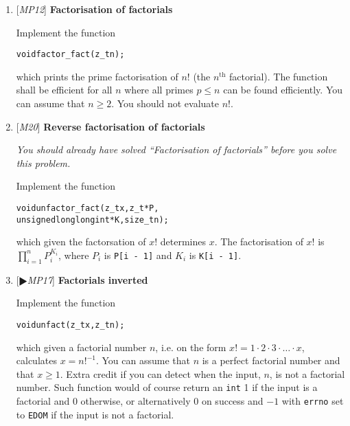 \begin{enumerate}[label=\textbf{\arabic*}.]
\item {[\textit{MP12}]} \textbf{Factorisation of factorials}

Implement the function

\vspace{-1em}
\begin{alltt}
   void factor_fact(z_t n);
\end{alltt}
\vspace{-1em}

\noindent
which prints the prime factorisation of $n!$
(the $n^{\text{th}}$ factorial). The function shall
be efficient for all $n$ where all primes $p \le n$
can be found efficiently. You can assume that
$n \ge 2$. You should not evaluate $n!$.



\item {[\textit{M20}]} \textbf{Reverse factorisation of factorials}

{\small\textit{You should already have solved
``Factorisation of factorials'' before you solve
this problem.}}

Implement the function

\vspace{-1em}
\begin{alltt}
   void unfactor_fact(z_t x, z_t *P,
        unsigned long long int *K, size_t n);
\end{alltt}
\vspace{-1em}

\noindent
which given the factorsation of $x!$ determines $x$.
The factorisation of $x!$ is
$\displaystyle{\prod_{i = 1}^{n} P_i^{K_i}}$, where
$P_i$ is \texttt{P[i - 1]} and $K_i$ is \texttt{K[i - 1]}.



\item {[$\RHD$\textit{MP17}]} \textbf{Factorials inverted}

Implement the function

\vspace{-1em}
\begin{alltt}
   void unfact(z_t x, z_t n);
\end{alltt}
\vspace{-1em}

\noindent
which given a factorial number $n$, i.e. on the form
$x! = 1 \cdot 2 \cdot 3 \cdot \ldots \cdot x$,
calculates $x = n!^{-1}$. You can assume that
$n$ is a perfect factorial number and that $x \ge 1$.
Extra credit if you can detect when the input, $n$,
is not a factorial number. Such function would of
course return an \texttt{int} 1 if the input is a
factorial and 0 otherwise, or alternatively 0
on success and $-1$ with \texttt{errno} set to
\texttt{EDOM} if the input is not a factorial.




\end{enumerate}
